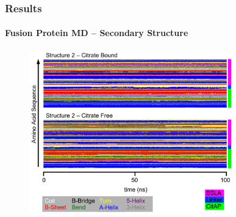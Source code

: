 \documentclass[english]{beamer}
\begin{document}

\begin{frame}
    \frametitle{Results}
    \framesubtitle{Fusion Protein MD -- Secondary Structure}  

    \begin{figure}
        \includegraphics[width=0.78\textwidth]{figures/DSSP/dssp_presentation.pdf}
    \end{figure}        
    
\end{frame}      

\end{document}
